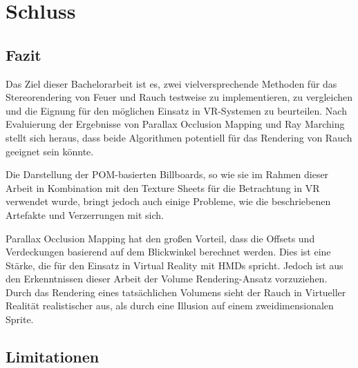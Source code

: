 \section{Schluss}
\label{sec:6}

\subsection{Fazit}
\label{sec:6.1}
Das Ziel dieser Bachelorarbeit ist es, zwei vielversprechende Methoden für das Stereorendering von Feuer und Rauch testweise zu implementieren, 
zu vergleichen und die Eignung für den möglichen Einsatz in VR-Systemen zu beurteilen. 
Nach Evaluierung der Ergebnisse von Parallax Occlusion Mapping und Ray Marching stellt sich heraus, dass beide Algorithmen potentiell für das Rendering von Rauch geeignet sein könnte.

Die Darstellung der POM-basierten Billboards, so wie sie im Rahmen dieser Arbeit in Kombination mit den Texture Sheets für die Betrachtung in VR verwendet wurde, 
bringt jedoch auch einige Probleme, wie die beschriebenen Artefakte und Verzerrungen mit sich. 

Parallax Occlusion Mapping hat den großen Vorteil, dass die Offsets und Verdeckungen basierend auf dem Blickwinkel berechnet werden. 
Dies ist eine Stärke, die für den Einsatz in Virtual Reality mit HMDs spricht. Jedoch ist aus den Erkenntnissen dieser Arbeit der Volume Rendering-Ansatz vorzuziehen. 
Durch das Rendering eines tatsächlichen Volumens sieht der Rauch in Virtueller Realität realistischer aus, als durch eine Illusion auf einem zweidimensionalen Sprite. 


\subsection{Limitationen}
\label{sec:6.2}

